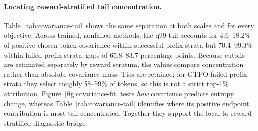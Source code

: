\documentclass[letterpaper]{article} %
\begin{document}
\paragraph{Locating reward-stratified tail concentration.}
Table~\ref{tab:covariance-tail} shows the same separation at both scales and for every objective. Across trained, nonfailed methods, the q99 tail accounts for 4.6--18.2\% of positive chosen-token covariance within successful-prefix strata but 70.4--99.3\% within failed-prefix strata, gaps of 65.8--83.7 percentage points. Because cutoffs are estimated separately by reward stratum, the values compare concentration rather than absolute covariance mass. Ties are retained; for GTPO failed-prefix strata they select roughly 58--59\% of tokens, so this is not a strict top-1\% attribution. Figure~\ref{fig:covariance-fit} tests \emph{how} covariance predicts entropy change, whereas Table~\ref{tab:covariance-tail} identifies where its positive endpoint contribution is most tail-concentrated. Together they support the local-to-reward-stratified diagnostic bridge.
\end{document}
